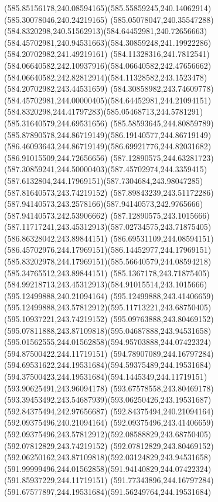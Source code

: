 {{	\curveto(585.85156178,240.08594165)(585.55859245,240.14062914)(585.30078046,240.24219165)
	\curveto(585.05078047,240.35547288)(584.8320298,240.51562913)(584.64452981,240.72656663)
	\curveto(584.45702981,240.94531663)(584.30859248,241.19922286)(584.20702982,241.49219161)
	\curveto(584.11328316,241.7812541)(584.06640582,242.10937916)(584.06640582,242.47656662)
	\curveto(584.06640582,242.82812914)(584.11328582,243.1523478)(584.20702982,243.44531659)
	\curveto(584.30858982,243.74609778)(584.45702981,244.00000405)(584.64452981,244.21094151)
	\curveto(584.8320298,244.41797283)(585.05468713,244.5781291)(585.31640579,244.69531656)
	\curveto(585.58593645,244.80859789)(585.87890578,244.86719149)(586.19140577,244.86719149)
	\curveto(586.46093643,244.86719149)(586.69921776,244.82031682)(586.91015509,244.72656656)
	\curveto(587.12890575,244.63281723)(587.30859241,244.50000403)(587.45702974,244.3359415)
	\curveto(587.6132804,244.17969151)(587.7304684,243.98047285)(587.81640573,243.74219152)
	\curveto(587.89843239,243.51172286)(587.94140573,243.2578166)(587.94140573,242.9765666)
	\lineto(587.94140573,242.53906662)
	\closepath
	\moveto(587.12890575,243.1015666)
	\curveto(587.11717241,243.45312913)(587.02734575,243.71875405)(586.86328042,243.89844151)
	\curveto(586.69531109,244.08594151)(586.45702976,244.17969151)(586.14452977,244.17969151)
	\curveto(585.83202978,244.17969151)(585.56640579,244.08594218)(585.34765512,243.89844151)
	\curveto(585.1367178,243.71875405)(584.99218713,243.45312913)(584.91015514,243.1015666)
	\closepath
	\moveto(595.12499888,240.21094164)
	\lineto(595.12499888,243.41406659)
	\curveto(595.12499888,243.57812912)(595.11713221,243.68750405)(595.10937221,243.74219152)
	\curveto(595.09763888,243.80469152)(595.07811888,243.87109818)(595.04687888,243.94531658)
	\curveto(595.01562555,244.01562858)(594.95703888,244.07422324)(594.87500422,244.11719151)
	\curveto(594.78907089,244.16797284)(594.69531622,244.19531684)(594.59375489,244.19531684)
	\curveto(594.37500423,244.19531684)(594.1445349,244.11719151)(593.90625491,243.96094178)
	\curveto(593.67578558,243.80469178)(593.39453492,243.54687939)(593.06250426,243.19531687)
	\lineto(592.84375494,242.97656687)
	\lineto(592.84375494,240.21094164)
	\lineto(592.09375496,240.21094164)
	\lineto(592.09375496,243.41406659)
	\curveto(592.09375496,243.57812912)(592.08588829,243.68750405)(592.07812829,243.74219152)
	\curveto(592.07812829,243.80469152)(592.06250162,243.87109818)(592.03124829,243.94531658)
	\curveto(591.99999496,244.01562858)(591.94140829,244.07422324)(591.85937229,244.11719151)
	\curveto(591.77343896,244.16797284)(591.67577897,244.19531684)(591.56249764,244.19531684)
}}
